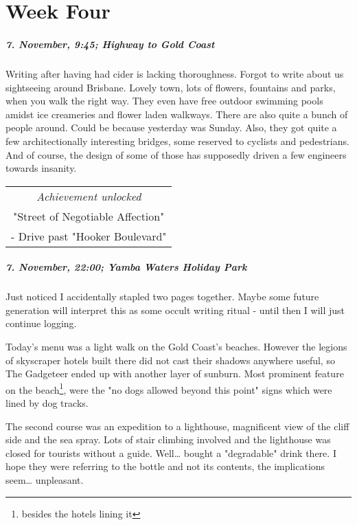 \chapter{Week Four}


\paragraph{7. November, 9:45; Highway to Gold Coast}
Writing after having had cider is lacking thoroughness.
Forgot to write about us sightseeing around Brisbane.
Lovely town, lots of flowers, fountains and parks, when you walk the right way.
They even have free outdoor swimming pools amidst ice creameries and flower laden walkways.
There are also quite a bunch of people around.
Could be because yesterday was Sunday.
Also, they got quite a few architectionally interesting bridges, some reserved to cyclists and pedestrians.
And of course, the design of some of those has supposedly driven a few engineers towards insanity.

\begin{center}
\begin{tabular}{||c||}
\emph{Achievement unlocked}\\
"Street of Negotiable Affection"\\
\multicolumn{1}{||p{0.8\textwidth}||}{\footnotesize - Drive past "Hooker Boulevard"} \\
\end{tabular}
\end{center}

\paragraph{7. November, 22:00; Yamba Waters Holiday Park}
Just noticed I accidentally stapled two pages together.
Maybe some future generation will interpret this as some occult writing ritual - until then I will just continue logging.

Today's menu was a light walk on the Gold Coast's beaches.
However the legions of skyscraper hotels built there did not cast their shadows anywhere useful, so The Gadgeteer ended up with another layer of sunburn.
Most prominent feature on the beach\footnote{besides the hotels lining it}, were the "no dogs allowed beyond this point" signs which were lined by dog tracks.

The second course was an expedition to a lighthouse, magnificent view of the cliff side and the sea spray.
Lots of stair climbing involved and the lighthouse was closed for tourists without a guide.
Well\ldots{} bought a "degradable" drink there.
I hope they were referring to the bottle and not its contents, the implications seem\ldots{} unpleasant.

